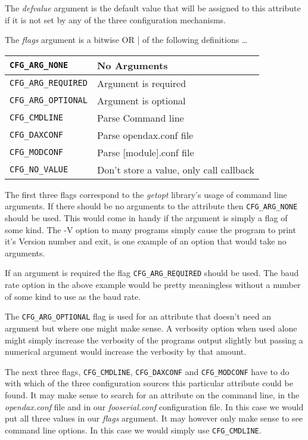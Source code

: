 The \textit{defvalue} argument is the default value that will be assigned to
this attribute if it is not set by any of the three configuration mechanisms.

The \textit{flags} argument is a bitwise OR {|} of the following definitions
\ldots

\begin{tabular}{|l|l|}
\hline \verb|CFG_ARG_NONE| & No Arguments \\
\hline \verb|CFG_ARG_REQUIRED| & Argument is required \\
\hline \verb|CFG_ARG_OPTIONAL| & Argument is optional \\
\hline \verb|CFG_CMDLINE| & Parse Command line \\
\hline \verb|CFG_DAXCONF| & Parse opendax.conf file \\
\hline \verb|CFG_MODCONF| & Parse [module].conf file \\
\hline \verb|CFG_NO_VALUE| & Don't store a value, only call callback \\
\hline
\end{tabular}

The first three flags correspond to the \textit{getopt} library's usage of
command line arguments.  If there should be no arguments to the attribute then
\verb|CFG_ARG_NONE| should be used.  This would come in handy if the argument is
simply a flag of some kind.  The -V option to many programs simply cause the
program to print it's Version number and exit, is one example of an option that
would take no arguments.

If an argument is required the flag \verb|CFG_ARG_REQUIRED| should be used.  The
baud rate option in the above example would be pretty meaningless without a
number of some kind to use as the baud rate.

The \verb|CFG_ARG_OPTIONAL| flag is used for an attribute that doesn't need an
argument but where one might make sense.  A verbosity option when used alone
might simply increase the verbosity of the programs output slightly but passing
a numerical argument would increase the verbosity by that amount.

The next three flags, \verb|CFG_CMDLINE|, \verb|CFG_DAXCONF| and
\verb|CFG_MODCONF| have to do with which of the three configuration sources this
particular attribute could be found.  It may make sense to search for an
attribute on the command line, in the \textit{opendax.conf} file and in our
\textit{fooserial.conf} configuration file.  In this case we would put all three
values in our \textit{flags} argument.  It may however only make sense to see
command line options.  In this case we would simply use \verb|CFG_CMDLINE|.

